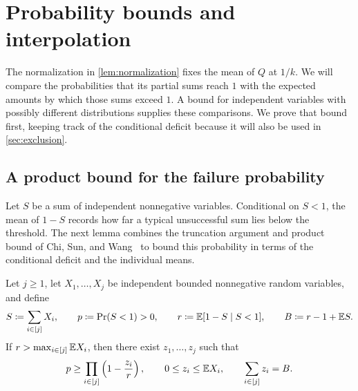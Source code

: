 \section{Probability bounds and interpolation}\label{sec:comparison}

The normalization in \cref{lem:normalization} fixes the mean of $Q$ at $1/k$. We will compare the probabilities that its partial sums reach $1$ with the expected amounts by which those sums exceed $1$. A bound for independent variables with possibly different distributions supplies these comparisons. We prove that bound first, keeping track of the conditional deficit because it will also be used in \cref{sec:exclusion}.

\subsection{A product bound for the failure probability}

Let $S$ be a sum of independent nonnegative variables. Conditional on $S<1$, the mean of $1-S$ records how far a typical unsuccessful sum lies below the threshold. The next lemma combines the truncation argument and product bound of Chi, Sun, and Wang~\cite[Lemmas 2.11--2.12]{CSW2026} to bound this probability in terms of the conditional deficit and the individual means.

\begin{lemma}\label{lem:product}
Let $j\ge1$, let $X_1,\ldots,X_j$ be independent bounded nonnegative random variables, and define
\begin{align*}
 S\coloneqq\sum_{i\in[j]}X_i,
 \qquad p\coloneqq\Pr(S<1)>0,
 \qquad r\coloneqq\mathbb E[1-S\mid S<1],
 \qquad B\coloneqq r-1+\mathbb E S.
\end{align*}
If $r>\max_{i\in[j]}\mathbb E X_i$, then there exist $z_1,\ldots,z_j$ such that
\begin{align}\label{eq:product-bound}
 p\ge\prod_{i\in[j]}\left(1-\frac{z_i}{r}\right),
 \qquad 0\le z_i\le\mathbb E X_i,
 \qquad \sum_{i\in[j]}z_i=B.
\end{align}
\end{lemma}

